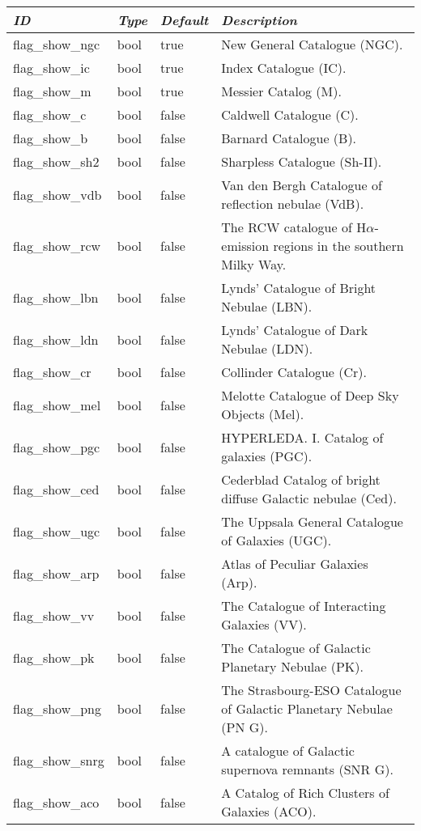 \begin{longtabu} to \textwidth {l|l|l|X}\toprule
\emph{ID} & \emph{Type} & \emph{Default} & \emph{Description}\\\midrule
flag\_show\_ngc  & bool & true  & New General Catalogue (NGC). \\\midrule
flag\_show\_ic   & bool & true  & Index Catalogue (IC). \\\midrule
flag\_show\_m    & bool & true  & Messier Catalog (M). \\\midrule
flag\_show\_c    & bool & false & Caldwell Catalogue (C). \\\midrule
flag\_show\_b    & bool & false & Barnard Catalogue (B). \\\midrule
flag\_show\_sh2  & bool & false & Sharpless Catalogue (Sh-II). \\\midrule
flag\_show\_vdb  & bool & false & Van den Bergh Catalogue of reflection nebulae (VdB). \\\midrule
flag\_show\_rcw  & bool & false & The RCW catalogue of H$\alpha$-emission regions in the southern Milky Way. \\\midrule
flag\_show\_lbn  & bool & false & Lynds' Catalogue of Bright Nebulae (LBN). \\\midrule
flag\_show\_ldn  & bool & false & Lynds' Catalogue of Dark Nebulae (LDN). \\\midrule
flag\_show\_cr   & bool & false & Collinder Catalogue (Cr). \\\midrule
flag\_show\_mel  & bool & false & Melotte Catalogue of Deep Sky Objects (Mel).  \\\midrule
flag\_show\_pgc  & bool & false & HYPERLEDA. I. Catalog of galaxies (PGC). \\\midrule
flag\_show\_ced  & bool & false & Cederblad Catalog of bright diffuse Galactic nebulae (Ced). \\\midrule
flag\_show\_ugc  & bool & false & The Uppsala General Catalogue of Galaxies (UGC). \\\midrule
flag\_show\_arp  & bool & false & Atlas of Peculiar Galaxies (Arp). \\\midrule
flag\_show\_vv   & bool & false & The Catalogue of Interacting Galaxies (VV). \\\midrule
flag\_show\_pk   & bool & false & The Catalogue of Galactic Planetary Nebulae (PK). \\\midrule
flag\_show\_png  & bool & false & The Strasbourg-ESO Catalogue of Galactic Planetary Nebulae (PN G). \\\midrule
flag\_show\_snrg & bool & false & A catalogue of Galactic supernova remnants (SNR G). \\\midrule
flag\_show\_aco  & bool & false & A Catalog of Rich Clusters of Galaxies (ACO). \\\bottomrule
\end{longtabu}

